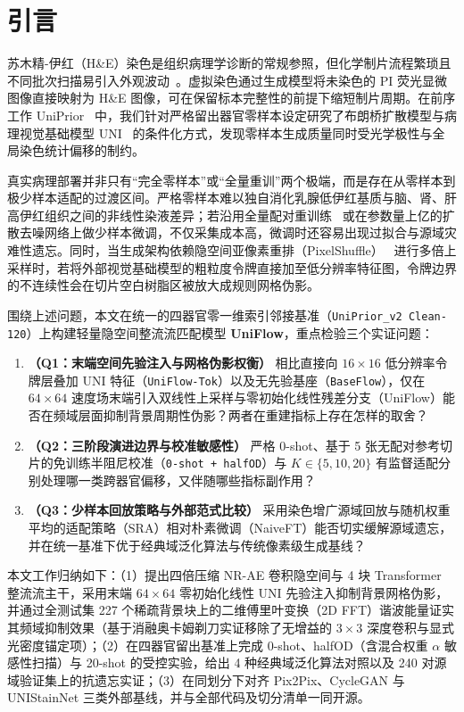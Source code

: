 \documentclass[journal]{IEEEtran}
\newcommand{\methodname}{UniFlow}
\begin{document}
\section{引言}
苏木精-伊红（H\&E）染色是组织病理学诊断的常规参照，但化学制片流程繁琐且不同批次扫描易引入外观波动~\cite{ref_bai,ref_kreiss,ref_kloeckner}。虚拟染色通过生成模型将未染色的 PI 荧光显微图像直接映射为 H\&E 图像，可在保留标本完整性的前提下缩短制片周期。在前序工作 UniPrior~\cite{ref_uniprior} 中，我们针对严格留出器官零样本设定研究了布朗桥扩散模型与病理视觉基础模型 UNI~\cite{ref_uni} 的条件化方式，发现零样本生成质量同时受光学极性与全局染色统计偏移的制约。

真实病理部署并非只有“完全零样本”或“全量重训”两个极端，而是存在从零样本到极少样本适配的过渡区间。严格零样本难以独自消化乳腺低伊红基质与脑、肾、肝高伊红组织之间的非线性染液差异；若沿用全量配对重训练~\cite{ref_zhang} 或在参数量上亿的扩散去噪网络上做少样本微调，不仅采集成本高，微调时还容易出现过拟合与源域灾难性遗忘。同时，当生成架构依赖隐空间亚像素重排（PixelShuffle）~\cite{ref_shi} 进行多倍上采样时，若将外部视觉基础模型的粗粒度令牌直接加至低分辨率特征图，令牌边界的不连续性会在切片空白树脂区被放大成规则网格伪影。

围绕上述问题，本文在统一的四器官零一维索引邻接基准（\texttt{UniPrior\_v2 Clean-120}）上构建轻量隐空间整流流匹配模型 \textbf{\methodname{}}，重点检验三个实证问题：
\begin{enumerate}
    \item \textbf{（Q1：末端空间先验注入与网格伪影权衡）} 相比直接向 $16\times 16$ 低分辨率令牌层叠加 UNI 特征（\texttt{UniFlow-Tok}）以及无先验基座（\texttt{BaseFlow}），仅在 $64\times 64$ 速度场末端引入双线性上采样与零初始化线性残差分支（\methodname{}）能否在频域层面抑制背景周期性伪影？两者在重建指标上存在怎样的取舍？
    \item \textbf{（Q2：三阶段演进边界与校准敏感性）} 严格 0-shot、基于 5 张无配对参考切片的免训练半阻尼校准（\texttt{0-shot + halfOD}）与 $K \in \{5, 10, 20\}$ 有监督适配分别处理哪一类跨器官偏移，又伴随哪些指标副作用？
    \item \textbf{（Q3：少样本回放策略与外部范式比较）} 采用染色增广源域回放与随机权重平均的适配策略（SRA）相对朴素微调（NaiveFT）能否切实缓解源域遗忘，并在统一基准下优于经典域泛化算法与传统像素级生成基线？
\end{enumerate}

本文工作归纳如下：（1）提出四倍压缩 NR-AE 卷积隐空间与 4 块 Transformer 整流流主干，采用末端 $64\times 64$ 零初始化线性 UNI 先验注入抑制背景网格伪影，并通过全测试集 227 个稀疏背景块上的二维傅里叶变换（2D FFT）谐波能量证实其频域抑制效果（基于消融奥卡姆剃刀实证移除了无增益的 $3\times 3$ 深度卷积与显式光密度锚定项）；（2）在四器官留出基准上完成 0-shot、halfOD（含混合权重 $\alpha$ 敏感性扫描）与 20-shot 的受控实验，给出 4 种经典域泛化算法对照以及 240 对源域验证集上的抗遗忘实证；（3）在同划分下对齐 Pix2Pix、CycleGAN 与 UNIStainNet 三类外部基线，并与全部代码及切分清单一同开源。
\end{document}
